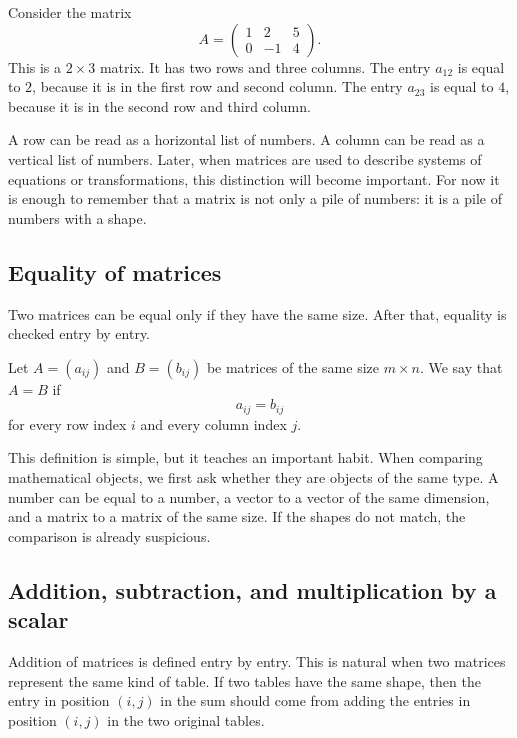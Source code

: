 \begin{examplebox}
Consider the matrix
\[
A=
\begin{pmatrix}
1 & 2 & 5\\
0 & -1 & 4
\end{pmatrix}.
\]
This is a \(2\times 3\) matrix. It has two rows and three columns. The entry \(a_{12}\) is equal to \(2\), because it is in the first row and second column. The entry \(a_{23}\) is equal to \(4\), because it is in the second row and third column.
\end{examplebox}

A row can be read as a horizontal list of numbers. A column can be read as a vertical list of numbers. Later, when matrices are used to describe systems of equations or transformations, this distinction will become important. For now it is enough to remember that a matrix is not only a pile of numbers: it is a pile of numbers with a shape.

\subsection{Equality of matrices}

Two matrices can be equal only if they have the same size. After that, equality is checked entry by entry.

\begin{definitionbox}
Let \(A=(a_{ij})\) and \(B=(b_{ij})\) be matrices of the same size \(m\times n\). We say that \(A=B\) if
\[
a_{ij}=b_{ij}
\]
for every row index \(i\) and every column index \(j\).
\end{definitionbox}

This definition is simple, but it teaches an important habit. When comparing mathematical objects, we first ask whether they are objects of the same type. A number can be equal to a number, a vector to a vector of the same dimension, and a matrix to a matrix of the same size. If the shapes do not match, the comparison is already suspicious.

\subsection{Addition, subtraction, and multiplication by a scalar}

Addition of matrices is defined entry by entry. This is natural when two matrices represent the same kind of table. If two tables have the same shape, then the entry in position \((i,j)\) in the sum should come from adding the entries in position \((i,j)\) in the two original tables.


